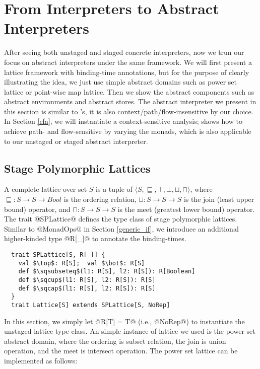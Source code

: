 \section{From Interpreters to Abstract Interpreters} \label{unstaged_abs}

After seeing both unstaged and staged concrete interpreters, now we trun our
focus on abstract interpreters under the same framework. We will first present a
lattice framework with binding-time annotations, but for the purpose of clearly
illustrating the idea, we just use simple abstract domains such as power set
lattice or point-wise map lattice. Then we show the abstract components such as
abstract environments and abstract stores.
The abstract interpreter we present in this section is similar to
\citet{DBLP:journals/pacmpl/DaraisLNH17}'s, it is also
context/path/flow-insensitive by our choice.  In Section \ref{cfa}, we will
instantiate a context-sensitive analysis;
\citet{Darais:2015:GTM:2814270.2814308} shows how to achieve path- and
flow-sensitive by varying the monads, which is also applicable to our unstaged or
staged abstract interpreter. 

\subsection{Stage Polymorphic Lattices} \label{stagedpoly_lat}

A complete lattice over set $S$ is a tuple of $\langle S, \sqsubseteq, \top,
\bot, \sqcup, \sqcap \rangle$, where $\sqsubseteq : S \to S \to Bool$ is the
ordering relation, $\sqcup: S \to S \to S$ is the join (least upper bound)
operator, and $\sqcap: S \to S \to S$ is the meet (greatest lower bound)
operator. The trait @SPLattice@ defines the type class of stage polymorphic
lattices. Similar to @MonadOps@ in Section \ref{generic_if}, we introduce an
additional higher-kinded type @R[_]@ to annotate the binding-times.

\begin{lstlisting}
  trait SPLattice[S, R[_]] {
    val $\top$: R[S];  val $\bot$: R[S]
    def $\sqsubseteq$(l1: R[S], l2: R[S]): R[Boolean]
    def $\sqcup$(l1: R[S], l2: R[S]): R[S]
    def $\sqcap$(l1: R[S], l2: R[S]): R[S]
  }
  trait Lattice[S] extends SPLattice[S, NoRep]
\end{lstlisting}

In this section, we simply let @R[T] = T@ (i.e., @NoRep@) to instantiate the
unstaged lattice type class. An simple instance of lattice we used is the power
set abstract domain, where the ordering is subset relation, the join is union
operation, and the meet is intersect operation. The power set lattice can be
implemented as follows:

